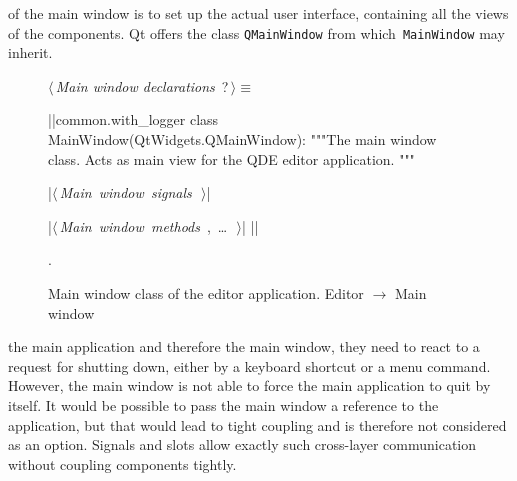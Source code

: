 \documentclass[%
    a4paper,    %
    justified,  %
    nobib,      %
    openany     %
]{tufte-book}
\begin{document}
 of the main window is to set up the actual
user interface, containing all the views of the components. Qt offers the class
\verb=QMainWindow= from which~\verb=MainWindow= may inherit.

\begin{figure}
\begin{flushleft} \small
\begin{minipage}{\linewidth}\label{scrap15}\raggedright\small
{} $\langle\,${\itshape Main window declarations}\nobreak\ {\footnotesize {?}}$\,\rangle\equiv$
\vspace{-1ex}
\begin{pythoncode}
|\normalfont{}\fontfamily{}|common.with_logger
class MainWindow(QtWidgets.QMainWindow):
    """The main window class.
    Acts as main view for the QDE editor application.
    """

    |\hbox{$\langle\,${\itshape Main window signals}\nobreak\ {\footnotesize {}}$\,\rangle$}|

    |\hbox{$\langle\,${\itshape Main window methods}\nobreak\ {\footnotesize {}, \ldots\ }$\,\rangle$}|
|\NWsep|
\end{pythoncode}
\vspace{1.5ex}
\footnotesize
\begin{list}{}{\setlength{\itemsep}{-\parsep}\setlength{\itemindent}{-\leftmargin}}
\item {\NWtxtMacroNoRef}.

\item{}
\end{list}
\end{minipage}\vspace{4ex}
\end{flushleft}
\caption{Main window class of the editor application.
  \newline{}\newline{}Editor $\rightarrow$ Main window}
  \label{editor:lst:main-window}
\end{figure}

 the main application and therefore the
main window, they need to react to a request for shutting down, either by a
keyboard shortcut or a menu command. However, the main window is not able to
force the main application to quit by itself. It would be possible to pass the
main window a reference to the application, but that would lead to tight
coupling and is therefore not considered as an option. Signals and slots allow
exactly such cross-layer communication without coupling components tightly.
\end{document}
